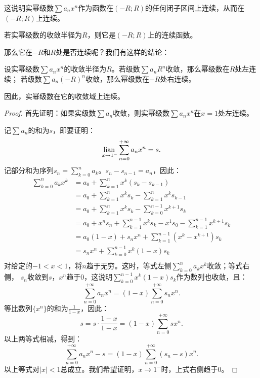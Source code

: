 \documentclass[12pt,UTF8]{ctexbook}
\begin{document}
\begin{appendix}
这说明实幂级数$\sum a_n x^n$作为函数在$(-R;R)$的任何闭子区间上连续，从而在$(-R;R)$上连续。

\begin{tm}\label{tm:c-4-0}
    若实幂级数的收敛半径为$R$，则它是$(-R;R)$上的连续函数。
\end{tm}

那么它在$-R$和$R$处是否连续呢？我们有这样的结论：

\begin{tm}\label{tm:c-4-10}
    设实幂级数$\sum a_n x^n$的收敛半径为$R$。若级数$\sum a_n R^n$收敛，那么幂级数在$R$处左连续；
    若级数$\sum a_n (-R)^n$收敛，那么幂级数在$-R$处右连续。
\end{tm}

因此，实幂级数在它的收敛域上连续。

\begin{proof}
    首先证明：如果实级数$\sum a_n$收敛，则实幂级数$\sum a_n x^n$在$x = 1$处左连续。

    记$\sum a_n$的和为$s$，即要证明：
    $$ \underset{x\to 1^-}{\operatorname{lian}\,} \sum_{n=0}^{+\infty}a_n x^n = s. $$
    记部分和为序列$ s_n = \sum_{k=0}^{n} a_k$。$s_{n} - s_{n-1} = a_n$，因此：
    \begin{align*}
        \sum_{k=0}^{n} a_k x^k &= a_0 + \sum_{k=1}^{n} x^k (s_k - s_{k-1}) \\
        &= a_0 + \sum_{k=1}^{n} x^k s_k - \sum_{k=1}^{n} x^k s_{k-1} \\
        &= a_0 + \sum_{k=1}^{n} x^k s_k - \sum_{k=0}^{n-1} x^{k+1} s_k \\
        &= a_0 + x^n s_n + \sum_{k=1}^{n-1} x^k s_k - x^1 s_0 - \sum_{k=1}^{n-1} x^{k+1} s_k \\
        &= a_0(1 - x) + s_n x^n + \sum_{k=1}^{n-1} (x^k - x^{k+1}) s_k \\
        &= s_n x^n + \sum_{k=0}^{n-1} x^k(1 - x) s_k \\
    \end{align*}
    对给定的$-1<x<1$，将$n$趋于无穷。这时，等式左侧$\sum_{k=0}^{n} a_k x^k$收敛；等式右侧，
    $s_n$收敛到$s$，$x^n$趋于$0$，这说明$\sum_{k=0}^{n-1} x^k(1 - x) s_k$作为数列也收敛，且：
    $$ \sum_{n=0}^{+\infty}a_n x^n = (1 - x)\sum_{n=0}^{+\infty}s_n x^n.$$
    等比数列$\{x^n\}$的和为$\frac{1}{1 - x}$，因此：
    $$ s = s \cdot \frac{1 - x}{1 - x} = (1 - x)\sum_{n=0}^{+\infty} s x^n. $$
    以上两等式相减，得到：
    $$ \sum_{n=0}^{+\infty}a_n x^n - s = (1 - x)\sum_{n=0}^{+\infty}(s_n - s) x^n.$$
    以上等式对$|x|<1$总成立。我们希望证明，$x\to 1^-$时，上式右侧趋于$0$。


\end{proof}
\end{appendix}
\end{document}
